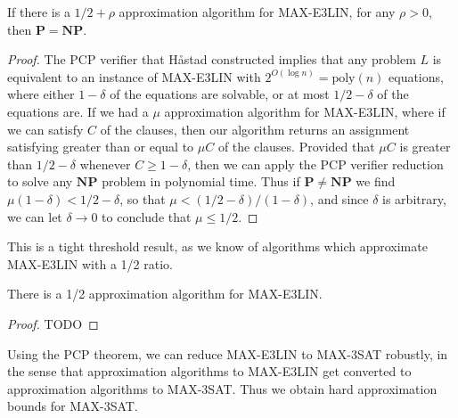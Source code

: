 \begin{theorem}
    If there is a $1/2 + \rho$ approximation algorithm for MAX-E3LIN, for any $\rho > 0$, then $\mathbf{P} = \mathbf{NP}$.
\end{theorem}
\begin{proof}
    The PCP verifier that Håstad constructed implies that any problem $L$ is equivalent to an instance of MAX-E3LIN with $2^{O(\log n)} = \text{poly}(n)$ equations, where either $1 - \delta$ of the equations are solvable, or at most $1/2 - \delta$ of the equations are. If we had a $\mu$ approximation algorithm for MAX-E3LIN, where if we can satisfy $C$ of the clauses, then our algorithm returns an assignment satisfying greater than or equal to $\mu C$ of the clauses. Provided that $\mu C$ is greater than $1/2 - \delta$ whenever $C \geq 1 - \delta$, then we can apply the PCP verifier reduction to solve any $\mathbf{NP}$ problem in polynomial time. Thus if $\mathbf{P} \neq \mathbf{NP}$ we find $\mu(1 - \delta) < 1/2 - \delta$, so that $\mu < (1/2 - \delta)/(1 - \delta)$, and since $\delta$ is arbitrary, we can let $\delta \to 0$ to conclude that $\mu \leq 1/2$.
\end{proof}

This is a tight threshold result, as we know of algorithms which approximate MAX-E3LIN with a 1/2 ratio.

\begin{theorem}
    There is a 1/2 approximation algorithm for MAX-E3LIN.
\end{theorem}
\begin{proof}
    TODO
\end{proof}

Using the PCP theorem, we can reduce MAX-E3LIN to MAX-3SAT robustly, in the sense that approximation algorithms to MAX-E3LIN get converted to approximation algorithms to MAX-3SAT. Thus we obtain hard approximation bounds for MAX-3SAT.

